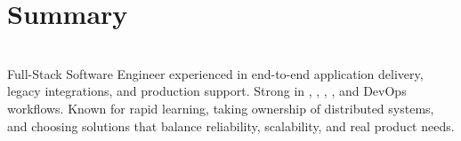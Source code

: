 \MainDivider
\section*{Summary}
\BigDivider\\
\noindent
Full-Stack Software Engineer experienced in end-to-end application delivery, legacy integrations, and production support. Strong in , , , , and DevOps workflows. Known for rapid learning, taking ownership of distributed systems, and choosing solutions that balance reliability, scalability, and real product needs.